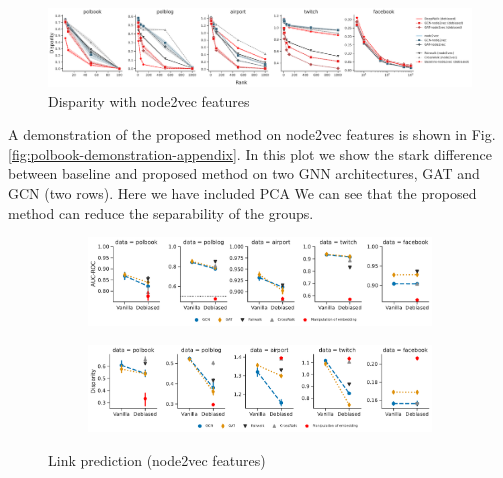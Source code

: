 \documentclass{article}
\theoremstyle{plain}
\theoremstyle{definition}
\theoremstyle{remark}
\begin{document}
\begin{figure}[h!]
    \centering
    \includegraphics[width=\hsize]{images/disparity-curve_node2vec.pdf}
    \caption{Disparity with node2vec features}
    \label{fig:entropy_node2vec}
\end{figure}
A demonstration of the proposed method on node2vec features is shown in Fig.\ref{fig:polbook-demonstration-appendix}. In this plot we show the stark difference between baseline and proposed method on two GNN architectures, GAT and GCN (two rows).
Here we have included PCA We can see that the proposed method can reduce the separability of the groups. 


\begin{figure}[h]
    
    \begin{subfigure}[t]{\textwidth}
        
        \includegraphics[width=.85\pdfpagewidth]{images/new_images/aucroc_node2vec.pdf}
        
        
        \label{fig:aucroc_node2vec}
    \end{subfigure}%
    
    \begin{subfigure}[t]{\textwidth}
        
        \includegraphics[width=.85 \pdfpagewidth]{images/new_images/disparity_node2vec.pdf}

        \label{fig:disparity_node2vec}
    \end{subfigure}%

  \caption{Link prediction (node2vec features)}
  \label{fig:sp_node2vec}
\end{figure}
\end{document}
